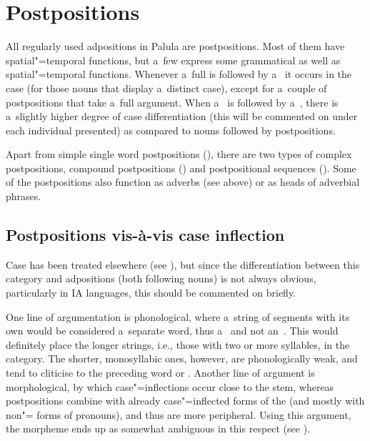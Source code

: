 \section{Postpositions}
\label{sec:7-2}

All regularly used adpositions in Palula are postpositions. Most of them have spatial"=temporal functions, but a~few express some grammatical as well as spatial"=temporal functions. Whenever a~full  is followed by a~ it occurs in the  case (for those nouns that display a~distinct  case), except for a~couple of postpositions that take a~full   argument. When a~ is followed by a~, there is a~slightly higher degree of case differentiation (this will be commented on under each individual  presented) as compared to nouns followed by postpositions.


Apart from simple single word postpositions (), there are two types of complex postpositions, compound postpositions () and postpositional sequences (). Some of the postpositions also function as adverbs (see above) or as heads of adverbial phrases. 


\subsection{Postpositions vis-à-vis case inflection}
\label{subsec:7-2-1}


Case  has been treated elsewhere (see ), but since the differentiation between this category and adpositions (both following nouns) is not always obvious, particularly in IA languages, this should be commented on briefly. 


One line of argumentation is phonological, where a~string of segments with its own  would be considered a~separate word, thus a~ and not an~. This would definitely place the longer strings, i.e., those with two or more syllables, in the  category. The shorter, monosyllabic ones, however, are phonologically weak, and tend to cliticise to the preceding  word or . Another line of argument is morphological, by which case"=inflections occur close to the stem, whereas postpositions combine with already case"=inflected forms of the  (and mostly with non"= forms of pronouns), and thus are more peripheral. Using this argument, the  morpheme ends up as somewhat ambiguous in this respect (see ).


